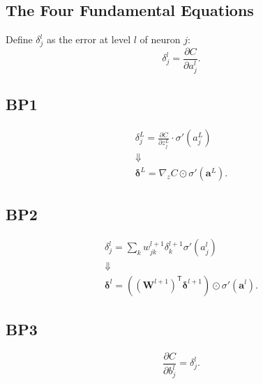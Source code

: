 \documentclass[a4paper,9pt]{extarticle}
\begin{document}
\begin{multicols*}{2}
		\section{The Four Fundamental Equations}
		Define $\delta_{j}^{l}$ as the error at level $l$ of neuron $j$:
		\begin{equation*}
			\delta_{j}^{l}=\frac{\partial C}{\partial a^{l}_{j}}.
		\end{equation*}
		\subsection{BP1}
		\begin{equation*}
			\begin{array}{c}
				\delta_{j}^{L}=\frac{\partial C}{\partial z^{L}_{j}}\cdot\sigma'(a^{L}_{j})\\
				\Downarrow\\
				\boldsymbol{\delta}^{L}=\nabla_{z}C\odot\sigma'(\mathbf{a}^{L}).
			\end{array}
		\end{equation*}
		\subsection{BP2}
		\begin{equation*}
			\begin{array}{c}
				\delta_{j}^{l}=\sum_{k}w_{jk}^{l+1}\delta_k^{l+1}\sigma'(a^{l}_{j})\\
				\Downarrow\\
				\boldsymbol{\delta}^{l}=((\mathbf{W}^{l+1})^{\mathsf{T}}\boldsymbol{\delta}^{l+1})\odot\sigma'(\mathbf{a}^{l}).
			\end{array}
		\end{equation*}
		\subsection{BP3}
		\begin{equation*}
			\frac{\partial C}{\partial b_{j}^{l}}=\delta^{l}_{j}.
		\end{equation*}

\end{multicols*}
\end{document}
